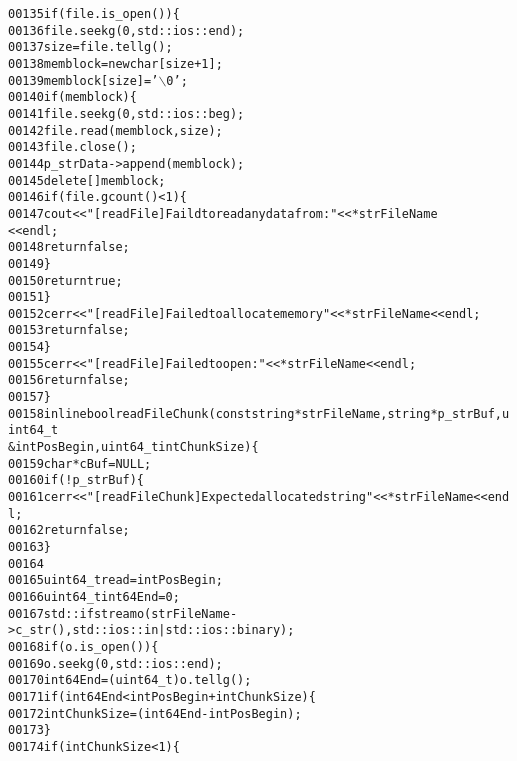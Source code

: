 \begin{footnotesize}
\begin{alltt}
00135         \textcolor{keywordflow}{if} (file.is\_open())\{
00136             file.seekg (0, std::ios::end);
00137             size = file.tellg();
00138             memblock = \textcolor{keyword}{new} \textcolor{keywordtype}{char} [size+1];
00139             memblock[size] = \textcolor{charliteral}{'\(\backslash\)0'};
00140             \textcolor{keywordflow}{if} (memblock)\{
00141                 file.seekg (0, std::ios::beg);
00142                 file.read (memblock, size);
00143                 file.close();
00144                 p\_strData->append(memblock);
00145                 \textcolor{keyword}{delete}[] memblock;
00146                 \textcolor{keywordflow}{if} (file.gcount() < 1)\{
00147                     cout<<\textcolor{stringliteral}{"[readFile] Faild to read any data from:"}<<*strFileName
      <<endl;
00148                     \textcolor{keywordflow}{return} \textcolor{keyword}{false};
00149                 \}
00150                 \textcolor{keywordflow}{return} \textcolor{keyword}{true};
00151             \}
00152             cerr<<\textcolor{stringliteral}{"[readFile] Failed to allocate memory "}<<*strFileName<<endl;
00153             \textcolor{keywordflow}{return} \textcolor{keyword}{false};
00154         \}
00155         cerr<<\textcolor{stringliteral}{"[readFile] Failed to open:"}<< *strFileName<<endl;
00156         \textcolor{keywordflow}{return} \textcolor{keyword}{false};
00157     \}
00158     \textcolor{keyword}{inline} \textcolor{keywordtype}{bool} readFileChunk(\textcolor{keyword}{const} \textcolor{keywordtype}{string} *strFileName,\textcolor{keywordtype}{string} *p\_strBuf,uint64\_t
       &intPosBegin,uint64\_t intChunkSize)\{
00159         \textcolor{keywordtype}{char} *cBuf = NULL;
00160         \textcolor{keywordflow}{if} (!p\_strBuf)\{
00161             cerr<<\textcolor{stringliteral}{"[readFileChunk] Expected allocated string "}<<*strFileName<<end
      l;
00162             \textcolor{keywordflow}{return} \textcolor{keyword}{false};
00163         \}
00164 
00165         uint64\_t read = intPosBegin;
00166         uint64\_t int64End = 0;
00167         std::ifstream o(strFileName->c\_str(), std::ios::in|std::ios::binary);
00168             \textcolor{keywordflow}{if}(o.is\_open())\{
00169                 o.seekg(0,std::ios::end);
00170                 int64End = (uint64\_t)o.tellg();
00171                 \textcolor{keywordflow}{if} (int64End < intPosBegin + intChunkSize)\{
00172                     intChunkSize = (int64End - intPosBegin );
00173                 \}
00174                 \textcolor{keywordflow}{if} (intChunkSize < 1)\{

\end{alltt}
\end{footnotesize}
